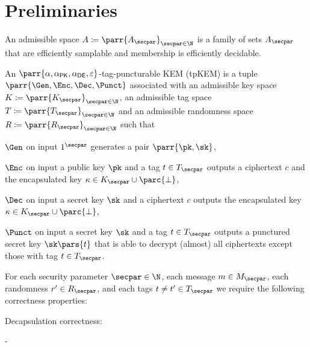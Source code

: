 \section{Preliminaries}
\label{sec:prelims}

\begin{definition}
    An admissible space \(A \coloneqq \parr{A_\secpar}_{\secpar \in \N}\) is a family of sets \(A_\secpar\) that are efficiently samplable and membership is efficiently decidable.
\end{definition}

\begin{definition}
    An \(\parr{\alpha,\alpha_{\textsf{PK}},\alpha_{\textsf{DE}},\varepsilon}\)-tag-puncturable KEM (tpKEM) is a tuple \(\parr{\Gen,\Enc,\Dec,\Punct}\) associated with
    an admissible key space \(K \coloneqq \parr{K_\secpar}_{\secpar \in \N}\),
    an admissible tag space \(T \coloneqq \parr{T_\secpar}_{\secpar \in \N}\) and
    an admissible randomness space \(R \coloneqq \parr{R_\secpar}_{\secpar \in \N}\) such that
    \begin{sitemize}
        \item \(\Gen\) on input \(1^\secpar\) generates a pair \(\parr{\pk,\sk}\),
        \item \(\Enc\) on input a public key \(\pk\) and a tag \(t \in T_\secpar\) outputs a ciphertext \(c\) and the encapsulated key \(\kappa \in K_\secpar \cup \parc{\bot}\),
        \item \(\Dec\) on input a secret key \(\sk\) and a ciphertext \(c\) outputs the encapsulated key \(\kappa \in K_\secpar \cup \parc{\bot}\),
        \item \(\Punct\) on input a secret key \(\sk\) and a tag \(t \in T_\secpar\) outputs a punctured secret key \(\sk\pars{t}\) that is able to decrypt (almost) all ciphertexts except those with tag \(t \in T_\secpar\).
    \end{sitemize}
    For each security parameter \(\secpar \in \N\),
    each message \(m \in M_\secpar\),
    each randomness \(r' \in R_\secpar\),
    and each tags \(t \neq t' \in T_\secpar\) we require the following correctness properties:
    \begin{sitemize}
        \item Decapsulation correctness:
        \begin{bralign}
             - \alpha\parr{\secpar}
        \end{bralign}


\end{sitemize}
\end{definition}
